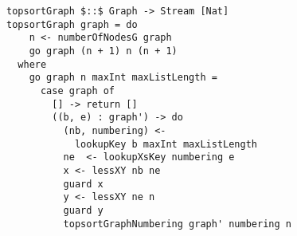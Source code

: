 \begin{figure}[!t]
  \centering
  \begin{minipage}{0.49\textwidth}
    \begin{lstlisting}[label={topsort_graph}, caption={Functional implementation for a \lstinline{topsortoTrue in out} direction}, captionpos=b, frame=tb]
topsortGraph $::$ Graph -> Stream [Nat]
topsortGraph graph = do
    n <- numberOfNodesG graph
    go graph (n + 1) n (n + 1)
  where
    go graph n maxInt maxListLength =
      case graph of
        [] -> return []
        ((b, e) : graph') -> do
          (nb, numbering) <-
            lookupKey b maxInt maxListLength
          ne  <- lookupXsKey numbering e
          x <- lessXY nb ne
          guard x
          y <- lessXY ne n
          guard y
          topsortGraphNumbering graph' numbering n
    \end{lstlisting}
  \end{minipage}
\end{figure}
